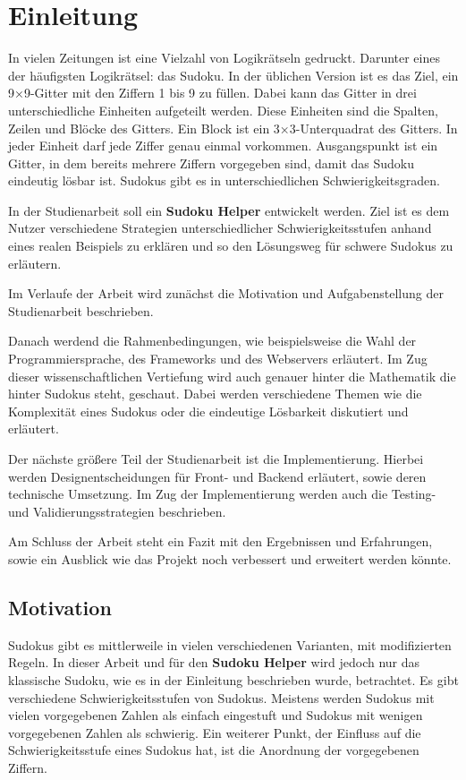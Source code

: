 
\chapter{Einleitung}
In vielen Zeitungen ist eine Vielzahl von Logikrätseln gedruckt. Darunter eines der häufigsten Logikrätsel: das Sudoku.
In der üblichen Version ist es das Ziel, ein 9×9-Gitter mit den Ziffern 1 bis 9 zu füllen. Dabei kann das Gitter in drei unterschiedliche Einheiten aufgeteilt werden. Diese Einheiten sind die Spalten, Zeilen und Blöcke des Gitters. Ein Block ist ein 3×3-Unterquadrat des Gitters. In jeder Einheit darf jede Ziffer genau einmal vorkommen.
Ausgangspunkt ist ein Gitter, in dem bereits mehrere Ziffern vorgegeben sind, damit das Sudoku eindeutig lösbar ist. Sudokus gibt es in unterschiedlichen Schwierigkeitsgraden. 

In der Studienarbeit soll ein \textbf{Sudoku Helper} entwickelt werden. Ziel ist es dem Nutzer verschiedene Strategien unterschiedlicher Schwierigkeitsstufen anhand eines realen Beispiels zu erklären und so den Lösungsweg für schwere Sudokus zu erläutern. \cite{FAZ} \cite{sudopedia_2022}

Im Verlaufe der Arbeit wird zunächst die Motivation und Aufgabenstellung der Studienarbeit beschrieben. 

Danach werdend die Rahmenbedingungen, wie beispielsweise die Wahl der Programmiersprache, des Frameworks und des Webservers erläutert. Im Zug dieser wissenschaftlichen Vertiefung wird auch genauer hinter die Mathematik die hinter Sudokus steht, geschaut. Dabei werden verschiedene Themen wie die Komplexität eines Sudokus oder die eindeutige Lösbarkeit diskutiert und erläutert.

Der nächste größere Teil der Studienarbeit ist die Implementierung. Hierbei werden Designentscheidungen für Front- und Backend erläutert, sowie deren technische Umsetzung. Im Zug der Implementierung werden auch die Testing- und Validierungsstrategien beschrieben.

Am Schluss der Arbeit steht ein Fazit mit den Ergebnissen und Erfahrungen, sowie ein Ausblick wie das Projekt noch verbessert und erweitert werden könnte.
 

\section{Motivation}
Sudokus gibt es mittlerweile in vielen verschiedenen Varianten, mit modifizierten Regeln. In dieser Arbeit und für den \textbf{Sudoku Helper} wird jedoch nur das klassische Sudoku, wie es in der Einleitung beschrieben wurde, betrachtet. Es gibt verschiedene Schwierigkeitsstufen von Sudokus. Meistens werden Sudokus mit vielen vorgegebenen Zahlen als einfach eingestuft und Sudokus mit wenigen vorgegebenen Zahlen als schwierig. Ein weiterer Punkt, der Einfluss auf die Schwierigkeitsstufe eines Sudokus hat, ist die Anordnung der vorgegebenen Ziffern.

